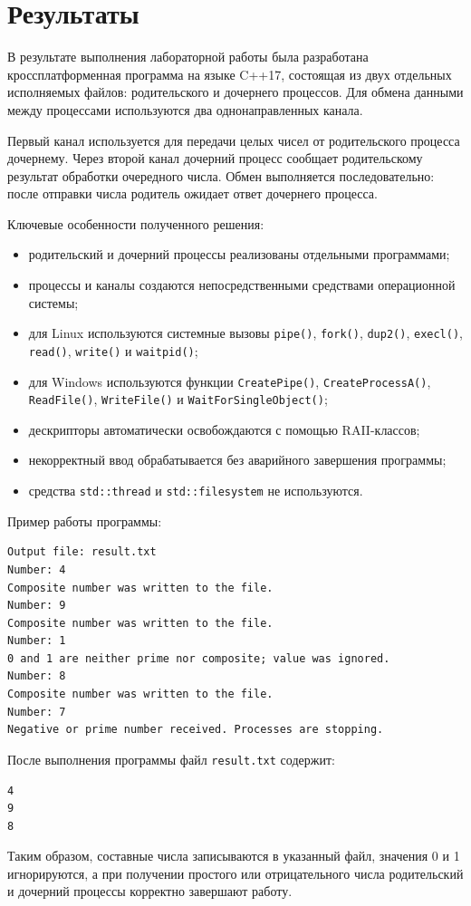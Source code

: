 \section{Результаты}

В результате выполнения лабораторной работы была разработана
кроссплатформенная программа на языке C++17, состоящая из двух отдельных
исполняемых файлов: родительского и дочернего процессов. Для обмена данными
между процессами используются два однонаправленных канала.

Первый канал используется для передачи целых чисел от родительского процесса
дочернему. Через второй канал дочерний процесс сообщает родительскому результат
обработки очередного числа. Обмен выполняется последовательно: после отправки
числа родитель ожидает ответ дочернего процесса.

Ключевые особенности полученного решения:

\begin{itemize}
    \item родительский и дочерний процессы реализованы отдельными программами;
    \item процессы и каналы создаются непосредственными средствами операционной
    системы;
    \item для Linux используются системные вызовы \texttt{pipe()},
    \texttt{fork()}, \texttt{dup2()}, \texttt{execl()}, \texttt{read()},
    \texttt{write()} и \texttt{waitpid()};
    \item для Windows используются функции \texttt{CreatePipe()},
    \texttt{CreateProcessA()}, \texttt{ReadFile()}, \texttt{WriteFile()} и
    \texttt{WaitForSingleObject()};
    \item дескрипторы автоматически освобождаются с помощью RAII-классов;
    \item некорректный ввод обрабатывается без аварийного завершения программы;
    \item средства \texttt{std::thread} и \texttt{std::filesystem} не
    используются.
\end{itemize}

Пример работы программы:

\begin{lstlisting}[language={}]
Output file: result.txt
Number: 4
Composite number was written to the file.
Number: 9
Composite number was written to the file.
Number: 1
0 and 1 are neither prime nor composite; value was ignored.
Number: 8
Composite number was written to the file.
Number: 7
Negative or prime number received. Processes are stopping.
\end{lstlisting}

После выполнения программы файл \texttt{result.txt} содержит:

\begin{lstlisting}[language={}]
4
9
8
\end{lstlisting}

Таким образом, составные числа записываются в указанный файл, значения 0 и 1
игнорируются, а при получении простого или отрицательного числа родительский и
дочерний процессы корректно завершают работу.
